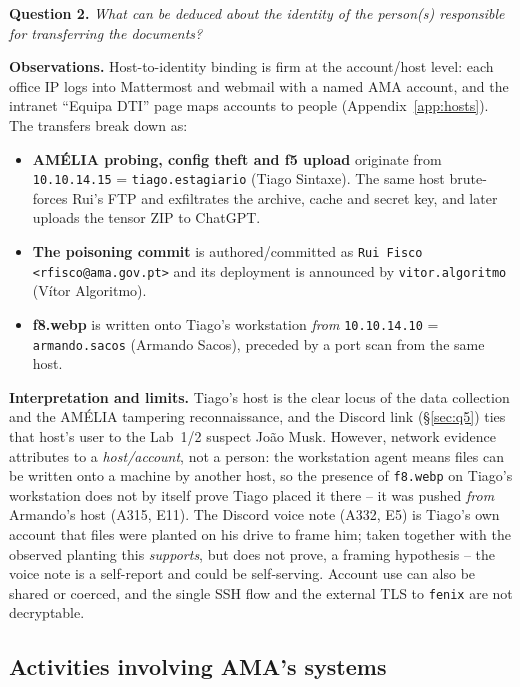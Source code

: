 \documentclass[11pt,a4paper,final,oneside]{article}
\begin{document}
\textbf{Question 2.} \textit{What can be deduced about the identity of the
person(s) responsible for transferring the documents?}

\textbf{Observations.} Host-to-identity binding is firm at the account/host level:
each office IP logs into Mattermost and webmail with a named AMA account, and the
intranet ``Equipa DTI'' page maps accounts to people (Appendix~\ref{app:hosts}).
The transfers break down as:
\begin{itemize}
  \item \textbf{AMÉLIA probing, config theft and f5 upload} originate from
  \texttt{10.10.14.15} = \texttt{tiago.estagiario} (Tiago Sintaxe). The same host
  brute-forces Rui's FTP and exfiltrates the archive, cache and secret key, and
  later uploads the tensor ZIP to ChatGPT.
  \item \textbf{The poisoning commit} is authored/committed as
  \texttt{Rui Fisco <rfisco@ama.gov.pt>} and its deployment is announced by
  \texttt{vitor.algoritmo} (Vítor Algoritmo).
  \item \textbf{f8.webp} is written onto Tiago's workstation \emph{from}
  \texttt{10.10.14.10} = \texttt{armando.sacos} (Armando Sacos), preceded by a
  port scan from the same host.
\end{itemize}

\textbf{Interpretation and limits.} Tiago's host is the clear locus of the data
collection and the AMÉLIA tampering reconnaissance, and the Discord link
(§\ref{sec:q5}) ties that host's user to the Lab~1/2 suspect João Musk. However,
network evidence attributes to a \emph{host/account}, not a person: the workstation
agent means files can be written onto a machine by another host, so the presence
of \texttt{f8.webp} on Tiago's workstation does not by itself prove Tiago placed
it there -- it was pushed \emph{from} Armando's host (A315, E11). The Discord
voice note (A332, E5) is Tiago's own account that files were planted on his drive
to frame him; taken together with the observed planting this \emph{supports}, but
does not prove, a framing hypothesis -- the voice note is a self-report and could
be self-serving. Account use can also be shared or coerced, and the single SSH
flow and the external TLS to \texttt{fenix} are not decryptable.

\subsection{Activities involving AMA's systems}
\label{sec:q3}
\end{document}
